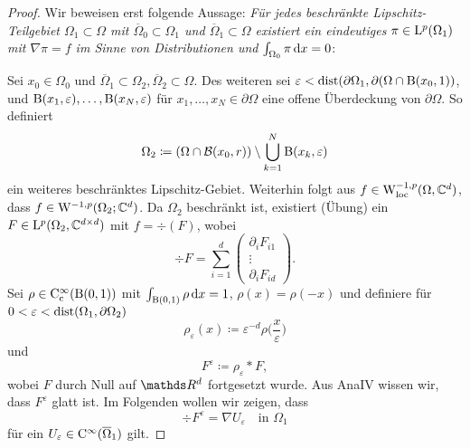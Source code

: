 \begin{proof}
  Wir beweisen erst folgende Aussage: \emph{Für jedes beschränkte Lipschitz-Teilgebiet $\Omega_1 \subset \Omega$ mit $\overline\Omega_0 \subset \Omega_1$ und $\overline\Omega_1 \subset \Omega$ existiert ein eindeutiges $\pi \in \mathrm{L}^p(\Omega_1)$ mit $\nabla\pi = f$ im Sinne von Distributionen und $\int_{\Omega_0} \pi \, {\operatorname{d}\!{x}} = 0$}:

  Sei $x_0 \in \Omega_0$ und $\overline\Omega_1 \subset \Omega_2, \overline\Omega_2 \subset \Omega$.
  Des weiteren sei $\varepsilon < \operatorname{dist}(\partial\Omega_1, \partial(\Omega \cap \mathrm{B}(x_0,1))$, und $\mathrm{B}(x_1,\varepsilon),\dots,\mathrm{B}(x_N,\varepsilon)$ für $x_1,\dots,x_N \in \partial\Omega$ eine offene Überdeckung von $\partial\Omega$.
  So definiert
  $$
  \Omega_2 \coloneqq (\Omega \cap \mathcal{B}(x_0, r)) \setminus \bigcup_{k = 1}^N \mathrm{B}(x_k , \varepsilon)
  $$
  ein weiteres beschränktes Lipschitz-Gebiet.
  Weiterhin folgt aus $f \in \mathrm{W}_{\operatorname{loc}}^{-1,p}(\Omega, \mathbb{C}^d)$, dass $f \in \mathrm{W}^{-1,p}(\Omega_2; \mathbb{C}^d)$.
  Da $\Omega_2$ beschränkt ist, existiert (Übung) ein $F \in \mathrm{L}^p(\Omega_2, \mathbb{C}^{d\times d})$ mit $f = \div(F)$, wobei
  $$
  \div F = \sum_{i = 1}^d \left( \begin{array}{c} \partial_i F_{i1} \\ \vdots \\ \partial_i F_{id} \end{array} \right).
  $$
  Sei $\rho \in \mathrm{C}_{\mathrm{c}}^\infty(\mathrm{B}(0,1))$ mit $\int_{\mathrm{B}(0,1)} \rho \, {\operatorname{d}\!{x}} = 1$, $\rho(x) = \rho(-x)$ und definiere für $0 < \varepsilon < \operatorname{dist}(\Omega_1, \partial\Omega_2)$
  $$
  \rho_\varepsilon(x) \coloneqq \varepsilon^{-d} \rho\Big(\frac{x}{\varepsilon}\Big)
  $$
  und
  $$
  F^\varepsilon \coloneqq \rho_\varepsilon \ast F,
  $$
  wobei $F$ durch Null auf $\R^d$ fortgesetzt wurde.
  Aus AnaIV wissen wir, dass $F^\varepsilon$ glatt ist.
  Im Folgenden wollen wir zeigen, dass 
  $$
  \div F^\varepsilon = \nabla U_\varepsilon \quad\text{in } \Omega_1
  $$
  für ein $U_\varepsilon \in \mathrm{C}^\infty(\overline\Omega_1)$ gilt.


\end{proof}

